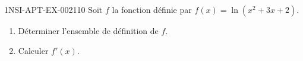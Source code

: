 \begin{exercice}{1NSI-APT-EX-002}{1}{10}
Soit $f$ la fonction définie par $f(x) = \ln(x^2 + 3x + 2)$.
\begin{enumerate}
  \item Déterminer l'ensemble de définition de $f$.
  \item Calculer $f'(x)$.
\end{enumerate}

\end{exercice}
